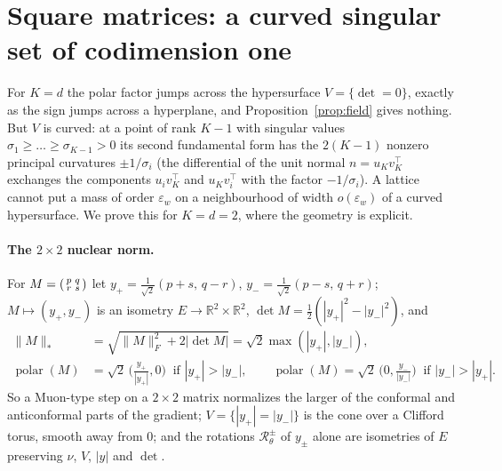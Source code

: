 \documentclass[10pt]{article}
\theoremstyle{definition}
\theoremstyle{remark}
\newcommand{\R}{\mathbb{R}}
\newcommand{\nnuc}[1]{\|#1\|_{*}}
\newcommand{\nF}[1]{\|#1\|_{F}}
\newcommand{\polar}{\operatorname{polar}}
\newcommand{\ew}{\varepsilon_w}
\begin{document}
\section{Square matrices: a curved singular set of codimension one}\label{sec:square}

For $K=d$ the polar factor jumps across the hypersurface $V=\{\det=0\}$, exactly as the sign jumps across a
hyperplane, and Proposition~\ref{prop:field} gives nothing. But $V$ is curved: at a point of rank $K-1$ with singular
values $\sigma_1\ge\dots\ge\sigma_{K-1}>0$ its second fundamental form has the $2(K-1)$ nonzero principal curvatures
$\pm1/\sigma_i$ (the differential of the unit normal $n=u_Kv_K^\top$ exchanges the components $u_iv_K^\top$ and
$u_Kv_i^\top$ with the factor $-1/\sigma_i$). A lattice cannot put a mass of order $\ew$ on a neighbourhood of width
$o(\ew)$ of a curved hypersurface. We prove this for $K=d=2$, where the geometry is explicit.

\paragraph{The $2\times2$ nuclear norm.} For $M=\begin{psmallmatrix}p&q\\r&s\end{psmallmatrix}$ let
$y_+=\frac1{\sqrt2}(p+s,\,q-r)$, $y_-=\frac1{\sqrt2}(p-s,\,q+r)$; $M\mapsto(y_+,y_-)$ is an isometry
$E\to\R^2\times\R^2$, $\det M=\frac12(|y_+|^2-|y_-|^2)$, and
\begin{align*}
\nnuc M&=\sqrt{\nF M^2+2|\det M|}=\sqrt2\max(|y_+|,|y_-|),\\
\polar(M)&=\sqrt2\,\Big(\frac{y_+}{|y_+|},0\Big)\ \text{ if }|y_+|>|y_-|,\qquad\polar(M)=\sqrt2\,\Big(0,\frac{y_-}{|y_-|}\Big)\ \text{ if }|y_-|>|y_+|.
\end{align*}
So a Muon-type step on a $2\times2$ matrix normalizes the larger of the conformal and anticonformal parts of the
gradient; $V=\{|y_+|=|y_-|\}$ is the cone over a Clifford torus, smooth away from $0$; and the rotations
$\mathcal R^\pm_\theta$ of $y_\pm$ alone are isometries of $E$ preserving $\nu$, $V$, $|y|$ and $\det$.
\end{document}
